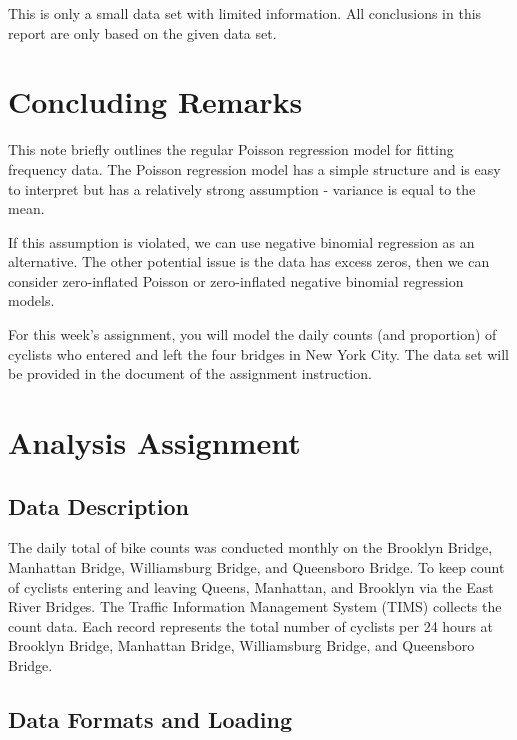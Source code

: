 \documentclass[
]{book}
\begin{document}
This is only a small data set with limited information. All conclusions in this report are only based on the given data set.

\hypertarget{concluding-remarks-2}{%
\section{Concluding Remarks}\label{concluding-remarks-2}}

This note briefly outlines the regular Poisson regression model for fitting frequency data. The Poisson regression model has a simple structure and is easy to interpret but has a relatively strong assumption - variance is equal to the mean.

If this assumption is violated, we can use negative binomial regression as an alternative. The other potential issue is the data has excess zeros, then we can consider zero-inflated Poisson or zero-inflated negative binomial regression models.

For this week's assignment, you will model the daily counts (and proportion) of cyclists who entered and left the four bridges in New York City. The data set will be provided in the document of the assignment instruction.

\hypertarget{analysis-assignment-3}{%
\section{Analysis Assignment}\label{analysis-assignment-3}}

\hypertarget{data-description-2}{%
\subsection{Data Description}\label{data-description-2}}

The daily total of bike counts was conducted monthly on the Brooklyn Bridge, Manhattan Bridge, Williamsburg Bridge, and Queensboro Bridge. To keep count of cyclists entering and leaving Queens, Manhattan, and Brooklyn via the East River Bridges. The Traffic Information Management System (TIMS) collects the count data. Each record represents the total number of cyclists per 24 hours at Brooklyn Bridge, Manhattan Bridge, Williamsburg Bridge, and Queensboro Bridge.

\hypertarget{data-formats-and-loading}{%
\subsection{Data Formats and Loading}\label{data-formats-and-loading}}
\end{document}
